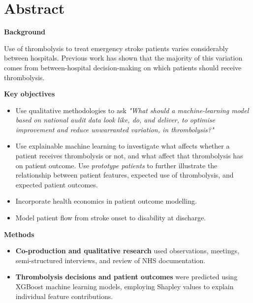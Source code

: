\section*{Abstract} %

\textbf{Background}

Use of thrombolysis to treat emergency stroke patients varies considerably between hospitals. Previous work has shown that the majority of this variation comes from between-hospital decision-making on which patients should receive thrombolysis.

\textbf{Key objectives} %

\begin{itemize}

    \item Use qualitative methodologies to ask \textit{"What should a machine-learning model based on national audit data look like, do, and deliver, to optimise improvement and reduce unwarranted variation, in thrombolysis?"}

    \item Use explainable machine learning to investigate what affects whether a patient receives thrombolysis or not, and what affect that thrombolysis has on patient outcome. Use \textit{prototype patients} to further illustrate the relationship between patient features, expected use of thrombolysis, and expected patient outcomes.
    
    \item Incorporate health economics in patient outcome modelling.

    \item Model patient flow from stroke onset to disability at discharge. 

\end{itemize}

\textbf{Methods}

\begin{itemize}

    \item \textbf{Co-production and qualitative research} used observations, meetings, semi-structured interviews, and review of NHS documentation.

    \item \textbf{Thrombolysis decisions and patient outcomes} were predicted using XGBoost machine learning models, employing Shapley values to explain individual feature contributions.
   
\end{itemize}

